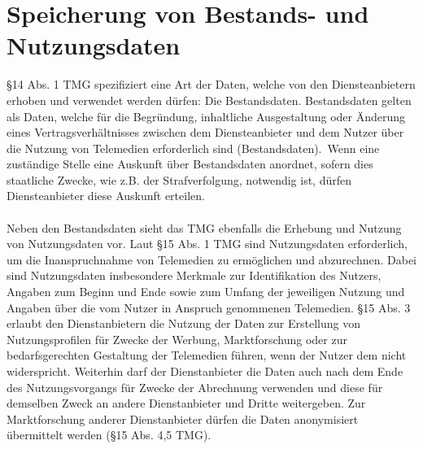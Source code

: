 \section{Speicherung von Bestands- und Nutzungsdaten}
\S 14 Abs. 1 TMG spezifiziert eine Art der Daten, welche von den Diensteanbietern erhoben und verwendet werden dürfen: Die Bestandsdaten. Bestandsdaten gelten als Daten, welche \glqq für die Begründung, inhaltliche Ausgestaltung oder Änderung eines Vertragsverhältnisses zwischen dem Diensteanbieter und dem Nutzer über die Nutzung von Telemedien erforderlich sind (Bestandsdaten).\grqq \ Wenn eine zuständige Stelle eine Auskunft über Bestandsdaten anordnet, sofern dies staatliche Zwecke, wie z.B. der Strafverfolgung, notwendig ist, dürfen Diensteanbieter diese Auskunft erteilen.\\
\\Neben den Bestandsdaten sieht das TMG ebenfalls die Erhebung und Nutzung von Nutzungsdaten vor. Laut \S 15 Abs. 1 TMG sind Nutzungsdaten erforderlich, um die Inanspruchnahme von Telemedien zu ermöglichen und abzurechnen. Dabei sind Nutzungsdaten insbesondere Merkmale zur Identifikation des Nutzers, Angaben zum Beginn und Ende sowie zum Umfang der jeweiligen Nutzung und Angaben über die vom Nutzer in Anspruch genommenen Telemedien. \S 15 Abs. 3 erlaubt den Dienstanbietern die Nutzung der Daten zur Erstellung von Nutzungsprofilen für Zwecke der Werbung, Marktforschung oder zur bedarfsgerechten Gestaltung der Telemedien führen, wenn der Nutzer dem nicht widerspricht. Weiterhin darf der Dienstanbieter die Daten auch nach dem Ende des Nutzungsvorgangs für Zwecke der Abrechnung verwenden und diese für demselben Zweck an andere Dienstanbieter und Dritte weitergeben. Zur Marktforschung anderer Dienstanbieter dürfen die Daten anonymisiert übermittelt werden (\S 15 Abs. 4,5 TMG).\\
